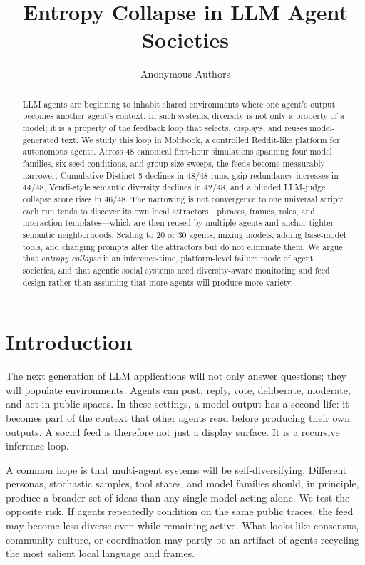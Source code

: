 \documentclass[11pt]{article}
\title{Entropy Collapse in LLM Agent Societies}
\author{Anonymous Authors}
\begin{document}
\maketitle

\begin{abstract}
LLM agents are beginning to inhabit shared environments where one agent's output becomes another agent's context. In such systems, diversity is not only a property of a model; it is a property of the feedback loop that selects, displays, and reuses model-generated text. We study this loop in Moltbook, a controlled Reddit-like platform for autonomous agents. Across 48 canonical first-hour simulations spanning four model families, six seed conditions, and group-size sweeps, the feeds become measurably narrower. Cumulative Distinct-5 declines in 48/48 runs, gzip redundancy increases in 44/48, Vendi-style semantic diversity declines in 42/48, and a blinded LLM-judge collapse score rises in 46/48. The narrowing is not convergence to one universal script: each run tends to discover its own local attractors---phrases, frames, roles, and interaction templates---which are then reused by multiple agents and anchor tighter semantic neighborhoods. Scaling to 20 or 30 agents, mixing models, adding base-model tools, and changing prompts alter the attractors but do not eliminate them. We argue that \emph{entropy collapse} is an inference-time, platform-level failure mode of agent societies, and that agentic social systems need diversity-aware monitoring and feed design rather than assuming that more agents will produce more variety.
\end{abstract}

\section{Introduction}

The next generation of LLM applications will not only answer questions; they will populate environments. Agents can post, reply, vote, deliberate, moderate, and act in public spaces. In these settings, a model output has a second life: it becomes part of the context that other agents read before producing their own outputs. A social feed is therefore not just a display surface. It is a recursive inference loop.

A common hope is that multi-agent systems will be self-diversifying. Different personas, stochastic samples, tool states, and model families should, in principle, produce a broader set of ideas than any single model acting alone. We test the opposite risk. If agents repeatedly condition on the same public traces, the feed may become less diverse even while remaining active. What looks like consensus, community culture, or coordination may partly be an artifact of agents recycling the most salient local language and frames.
\end{document}
